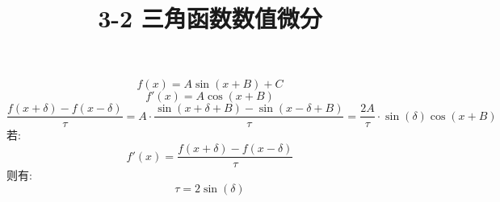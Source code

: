 \documentclass[11pt, a4paper]{ctexart}
\title{3-2 三角函数数值微分}
\author{}
\date{}
\begin{document}
\maketitle

\[
f(x)=A\sin(x+B)+C
\]
\[
f'(x)=A\cos(x+B)
\]
\[
\frac{f(x+\delta)-f(x-\delta)}{\tau} = A\cdot\frac{\sin(x+\delta+B)-\sin(x-\delta+B)}{\tau}= \frac{2A}{\tau}\cdot \sin(\delta) \cos(x+B)
\]
若:
\[
f'(x)=\frac{f(x+\delta)-f(x-\delta)}{\tau}
\]
则有:
\[
\tau = 2\sin(\delta)
\]
\end{document}

